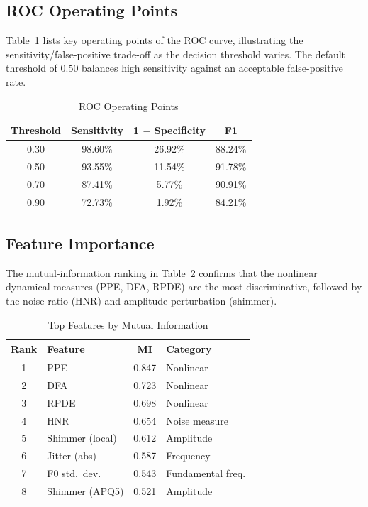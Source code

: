 \documentclass[oneside,a4paper,12pt]{report}
\begin{document}
\subsection{ROC Operating Points}
Table~\ref{tab:rocpts} lists key operating points of the ROC curve, illustrating
the sensitivity/false-positive trade-off as the decision threshold varies. The
default threshold of 0.50 balances high sensitivity against an acceptable
false-positive rate.

\begin{table}[H]
\centering
\caption{ROC Operating Points}
\label{tab:rocpts}
\def\arraystretch{1.2}
\begin{tabular}{|c|c|c|c|}
\hline
\textbf{Threshold} & \textbf{Sensitivity} & \textbf{1 $-$ Specificity} & \textbf{F1} \\ \hline
0.30 & 98.60\% & 26.92\% & 88.24\% \\ \hline
0.50 & 93.55\% & 11.54\% & 91.78\% \\ \hline
0.70 & 87.41\% & 5.77\% & 90.91\% \\ \hline
0.90 & 72.73\% & 1.92\% & 84.21\% \\ \hline
\end{tabular}
\end{table}

\subsection{Feature Importance}
The mutual-information ranking in Table~\ref{tab:featimp2} confirms that the
nonlinear dynamical measures (PPE, DFA, RPDE) are the most discriminative, followed
by the noise ratio (HNR) and amplitude perturbation (shimmer).

\begin{table}[H]
\centering
\caption{Top Features by Mutual Information}
\label{tab:featimp2}
\def\arraystretch{1.2}
\begin{tabular}{|c|l|c|l|}
\hline
\textbf{Rank} & \textbf{Feature} & \textbf{MI} & \textbf{Category} \\ \hline
1 & PPE & 0.847 & Nonlinear \\ \hline
2 & DFA & 0.723 & Nonlinear \\ \hline
3 & RPDE & 0.698 & Nonlinear \\ \hline
4 & HNR & 0.654 & Noise measure \\ \hline
5 & Shimmer (local) & 0.612 & Amplitude \\ \hline
6 & Jitter (abs) & 0.587 & Frequency \\ \hline
7 & F0 std.\ dev. & 0.543 & Fundamental freq. \\ \hline
8 & Shimmer (APQ5) & 0.521 & Amplitude \\ \hline
\end{tabular}
\end{table}
\end{document}
